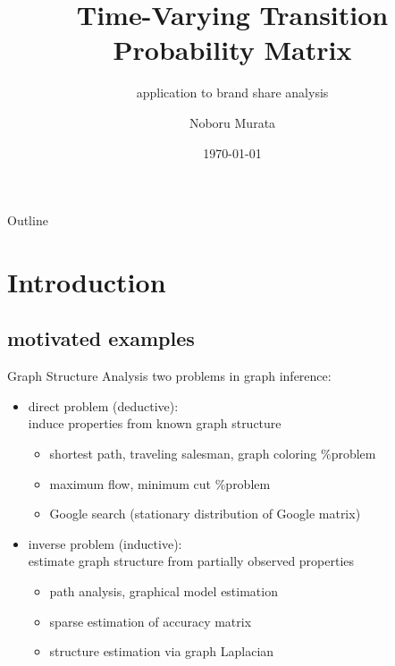 \documentclass[fleqn,aspectratio=1610]{beamer}
\author{Noboru Murata}
\date{\today}
\title{Time-Varying Transition Probability Matrix}
\subtitle{application to brand share analysis}
\institute{\url{https://noboru-murata.github.io/}}
\begin{document}
\maketitle
\begin{frame}{Outline}
\tableofcontents
\end{frame}


\section{Introduction}
\label{sec:orgd2a9d5d}
\subsection{motivated examples}
\label{sec:orgb7c087d}
\begin{frame}[label={sec:org0c4220f}]{Graph Structure Analysis}
two problems in graph inference:
\begin{itemize}
\item \alert{direct problem (deductive)}: \\[0pt]
induce properties from known graph structure
\begin{itemize}
\item shortest path, traveling salesman, graph coloring \%problem
\item maximum flow, minimum cut \%problem
\item Google search (stationary distribution of Google matrix)
\end{itemize}
\item \alert{inverse problem (inductive)}: \\[0pt]
estimate graph structure from partially observed properties
\begin{itemize}
\item path analysis, graphical model estimation
\item sparse estimation of accuracy matrix
\item structure estimation via graph Laplacian
\end{itemize}
\end{itemize}
\end{frame}
\end{document}
